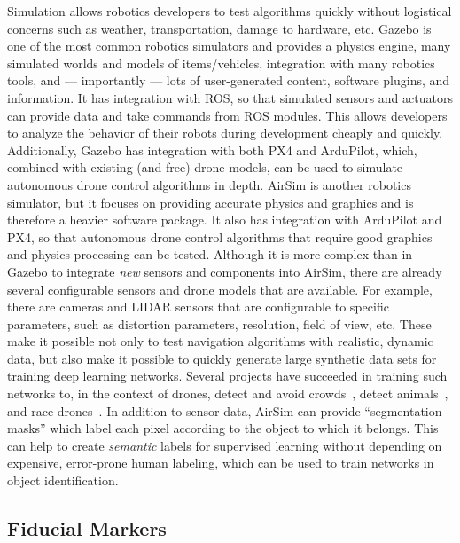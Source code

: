 Simulation allows robotics developers to test algorithms quickly without logistical concerns such as
weather, transportation, damage to hardware, etc.
Gazebo is one of the most common robotics simulators and provides a physics engine,
many simulated worlds and models of items/vehicles,
integration with many robotics tools,
and --- importantly --- lots of user-generated content, software plugins, and information.
It has integration with ROS, so that simulated sensors and actuators can provide data and take commands
from ROS modules.
This allows developers to analyze the behavior of their robots during development cheaply and quickly.
Additionally, Gazebo has integration with both PX4 and ArduPilot, which, combined with existing (and free)
drone models, can be used to simulate autonomous drone control algorithms in depth.
AirSim is another robotics simulator, but it focuses on providing accurate physics and graphics
and is therefore a heavier software package.
It also has integration with ArduPilot and PX4, so that autonomous drone control algorithms
that require good graphics and physics processing can be tested.
Although it is more complex than in Gazebo to integrate \textit{new} sensors and components into
AirSim, there are already several configurable sensors and drone models that are available.
For example, there are cameras and LIDAR sensors that are configurable to specific parameters,
such as distortion parameters, resolution, field of view, etc.
These make it possible not only to test navigation algorithms with realistic, dynamic data,
but also make it possible to quickly generate large synthetic data sets for training
deep learning networks.
Several projects have succeeded in training such networks to, in the context of drones,
detect and avoid crowds~\cite{airsim_crowd_detection},
detect animals~\cite{airsim_animal_recognition},
and race drones~\cite{airsim_drone_racing}.
In addition to sensor data, AirSim can provide ``segmentation masks'' which label each pixel
according to the object to which it belongs.
This can help to create \textit{semantic} labels for supervised learning without depending
on expensive, error-prone human labeling,
which can be used to train networks in object identification.

\subsection{Fiducial Markers}


